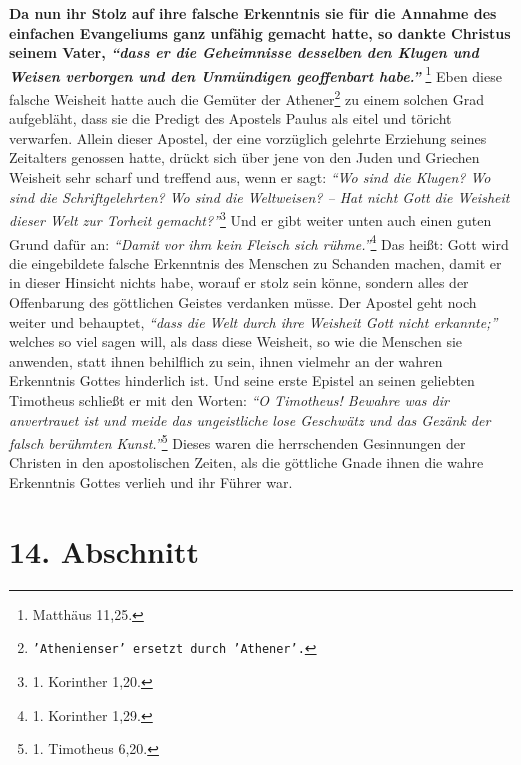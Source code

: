 \label{ref:07_13_gelehrte}
\textbf{Da nun ihr Stolz auf ihre falsche Erkenntnis
sie für die Annahme des einfachen
Evangeliums ganz unfähig gemacht hatte, so dankte Christus seinem Vater,
\textit{"`dass er die Geheimnisse desselben den Klugen und Weisen verborgen und
den Unmündigen geoffenbart habe."'}}
\footnote{Matthäus 11,25.}
Eben diese falsche Weisheit hatte
auch die Gemüter der
Athener\footnote{\texttt{'Athenienser' ersetzt durch
'Athener'.}} zu einem solchen Grad
aufgebläht, dass sie
die Predigt des Apostels Paulus als eitel und töricht
verwarfen. Allein dieser
Apostel, der eine vorzüglich gelehrte Erziehung seines Zeitalters genossen
hatte, drückt sich über jene von den Juden und
Griechen
Weisheit sehr scharf und treffend aus, wenn er sagt:
\textit{"`Wo sind die Klugen? Wo
sind die Schriftgelehrten? Wo sind die Weltweisen? -- Hat nicht Gott die
Weisheit dieser Welt zur Torheit gemacht?"'}\footnote{1. Korinther 1,20.}
Und er
gibt weiter unten auch einen guten Grund dafür an:
\textit{"`Damit vor ihm kein Fleisch sich rühme."'}\footnote{1. Korinther 1,29.}
Das heißt: Gott wird die eingebildete
falsche Erkenntnis des Menschen zu Schanden machen, damit er in dieser Hinsicht
nichts habe, worauf er stolz sein könne, sondern alles der
Offenbarung des
göttlichen Geistes verdanken müsse. Der Apostel geht noch weiter und behauptet,
\textit{"`dass die Welt durch ihre Weisheit Gott nicht erkannte;"'}
welches so viel sagen
will, als dass diese Weisheit, so wie die Menschen sie anwenden, statt ihnen
behilflich zu sein, ihnen vielmehr an der wahren Erkenntnis Gottes hinderlich
ist. Und seine erste Epistel an seinen geliebten Timotheus schließt er mit den
Worten:
\textit{"`O Timotheus! Bewahre was dir anvertrauet ist und meide das
ungeistliche lose Geschwätz und das Gezänk der falsch berühmten
Kunst."'}\footnote{1. Timotheus 6,20.}
Dieses waren die herrschenden Gesinnungen der
Christen in den apostolischen Zeiten, als die göttliche Gnade ihnen die wahre
Erkenntnis Gottes verlieh und ihr Führer war.

\section{14. Abschnitt} \label{kap7_ab14}

